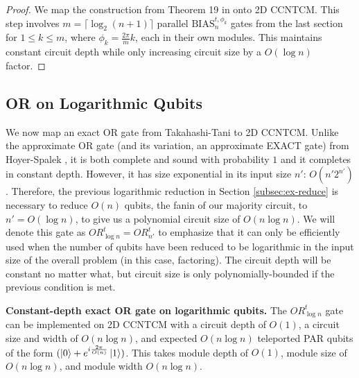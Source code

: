 \begin{proof}
We map the construction from Theorem 19 in \cite{Hoyer2002} onto
\textsf{2D CCNTCM}.
This step involves $m = \lceil \log_2 (n+1) \rceil$ parallel $\text{BIAS}^{t,\phi_k}_n$ gates from the last section for
$1 \le k \le m$, where $\phi_k = \frac{2\pi}{m}k$, each in their own modules.
This maintains constant circuit depth while only increasing circuit size by
a $O(\log n)$ factor.
\end{proof}

\subsection{OR on Logarithmic Qubits}
\label{subsec:or-log}

We now map an exact OR gate from Takahashi-Tani \cite{Takahashi2011} to \textsf{2D CCNTCM}.
Unlike the approximate OR gate (and its variation, an approximate EXACT gate) from Hoyer-Spalek \cite{Hoyer2002}, it is both
complete and sound with probability $1$ and it completes in
constant depth. However, it has size exponential in its input size $n'$: $O(n'2^{n'})$.
Therefore, the previous logarithmic reduction in Section \ref{subsec:ex-reduce}
is necessary to reduce $O(n)$ qubits, the fanin of our majority circuit,
to $n' = O(\log n)$, to give us a polynomial circuit size of $O(n\log n)$.
We will denote this gate as $OR^t_{\log n} = OR^t_{n'}$ to emphasize that it
can only be efficiently used when the number of qubits have been reduced to
be logarithmic in the input size of the overall problem (in this case, factoring).
The circuit depth will be constant no matter what, but circuit size is
only polynomially-bounded if the previous condition is met.

\begin{theorem}{\textbf{Constant-depth exact OR gate on logarithmic qubits.}}
The $OR^t_{\log n}$ gate can be implemented on \textsf{2D CCNTCM} with a
circuit depth of $O(1)$, a circuit size and width of $O(n\log n)$, and expected
$O(n \log n)$ teleported PAR qubits of the form $(\left\vert{0}\right\rangle + e^{i \frac{2\pi}{O(n)}}\left\vert{1}\right\rangle)$.
This takes module depth of $O(1)$, module size of $O(n\log n)$, and
module width $O(n\log n)$.
\label{thm:or-log}
\end{theorem}

